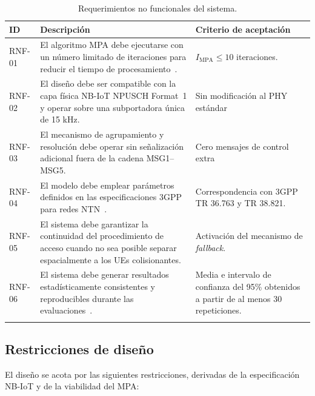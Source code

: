 \begin{table}[H]
\centering
\caption{Requerimientos no funcionales del sistema.}
\label{tab:rnf}
\small
\begin{tabularx}{\textwidth}{@{}l X X@{}}
\toprule
\textbf{ID} & \textbf{Descripción} & \textbf{Criterio de aceptación} \\
\midrule
RNF-01 & El algoritmo MPA debe ejecutarse con un número limitado de iteraciones para reducir el tiempo de procesamiento~\cite{ref29,ref30}. & $I_{\mathrm{MPA}} \leq 10$ iteraciones. \\
\addlinespace
RNF-02 & El diseño debe ser compatible con la capa física NB-IoT NPUSCH Format~1 y operar sobre una subportadora única de 15 kHz. & Sin modificación al PHY estándar \\
\addlinespace
RNF-03 & El mecanismo de agrupamiento y resolución debe operar sin señalización adicional fuera de la cadena MSG1--MSG5. & Cero mensajes de control extra \\
\addlinespace
RNF-04 & El modelo debe emplear parámetros definidos en las especificaciones 3GPP para redes NTN~\cite{ref19,ref21}. & Correspondencia con 3GPP TR 36.763 y TR 38.821.  \\
\addlinespace
RNF-05 & El sistema debe garantizar la continuidad del procedimiento de acceso cuando no sea posible separar espacialmente a los UEs colisionantes. & Activación del mecanismo de \textit{fallback}.  \\
\addlinespace
RNF-06 & El sistema debe generar resultados estadísticamente consistentes y reproducibles durante las evaluaciones~\cite{ref35}. & Media e intervalo de confianza del 95\% obtenidos a partir de al menos 30 repeticiones. \\\\
\bottomrule
\end{tabularx}
\end{table}

\subsection{Restricciones de diseño}
\label{sec:restricciones}

El diseño se acota por las siguientes restricciones, derivadas de la especificación NB-IoT y de la viabilidad del MPA:

